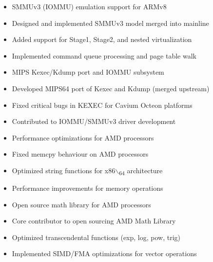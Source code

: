 \documentclass[12pt,a4paper]{pawesome-cv}
\begin{document}
\begin{cventries}
\begin{opensourcecontent}
\begin{itemize}
\item SMMUv3 (IOMMU) emulation support for ARMv8
\item Designed and implemented SMMUv3 model merged into mainline
\item Added support for Stage1, Stage2, and nested virtualization
\item Implemented command queue processing and page table walk
\end{itemize}
\end{opensourcecontent}
\begin{opensourcecontent}
\begin{itemize}
\item MIPS Kexec/Kdump port and IOMMU subsystem
\item Developed MIPS64 port of Kexec and Kdump (merged upstream)
\item Fixed critical bugs in KEXEC for Cavium Octeon platforms
\item Contributed to IOMMU/SMMUv3 driver development
\end{itemize}
\end{opensourcecontent}
\begin{opensourcecontent}
\begin{itemize}
\item Performance optimizations for AMD processors
\item Fixed memcpy behaviour on AMD processors
\item Optimized string functions for x86$\backslash$\textsubscript{64} architecture
\item Performance improvements for memory operations
\end{itemize}
\end{opensourcecontent}
\begin{opensourcecontent}
\begin{itemize}
\item Open source math library for AMD processors
\item Core contributor to open sourcing AMD Math Library
\item Optimized transcendental functions (exp, log, pow, trig)
\item Implemented SIMD/FMA optimizations for vector operations
\end{itemize}
\end{opensourcecontent}
\end{cventries}
\acvsidebarpagebreak
{}
\label{sec:org7635895}
\end{document}
